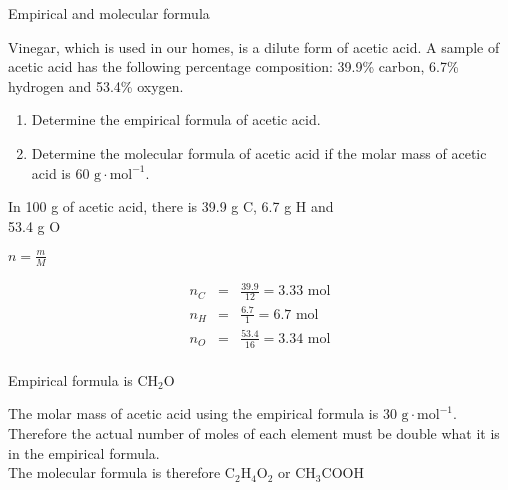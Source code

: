 \begin{wex}{Empirical and molecular formula\\}{Vinegar, which is used in our homes, is a dilute form of acetic acid. A sample of acetic acid has the following percentage composition: 39.9\% carbon, 6.7\% hydrogen and 53.4\% oxygen.
\begin{enumerate}
\item{Determine the empirical formula of acetic acid.}
\item{Determine the molecular formula of acetic acid if the molar mass of acetic acid is $60 \text{ g} \cdot \text{mol}^{-1}$.}
\end{enumerate}
}{

In 100 g of acetic acid, there is 39.9 g C, 6.7 g H and \\ 53.4 g O \\

$n= \frac{m}{M}$

\begin{eqnarray*}
n_C&=& \frac{39.9}{12} = 3.33 \text{ mol} \\
n_H&=& \frac{6.7}{1} = 6.7 \text{ mol}  \\
n_O&=& \frac{53.4}{16} = 3.34 \text{ mol} \\
\end{eqnarray*}

Empirical formula is CH$_2$O

The molar mass of acetic acid using the empirical formula is $30 \text{ g} \cdot \text{mol}^{-1}$. Therefore the actual number of moles of each element must be double what it is in the empirical formula.\\

The molecular formula is therefore C$_2$H$_4$O$_2$ or CH$_3$COOH
}
\end{wex}


